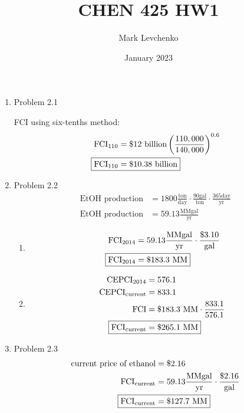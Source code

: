 \documentclass[12pt]{article}
\title{CHEN 425 HW1}
\author{Mark Levchenko}
\date{January 2023}
\begin{document}
\begin{enumerate}
    \item Problem 2.1 

    FCI using six-tenths method:
    \begin{align*}
        \mathrm{FCI}_{110} &= \$12 \text{ billion} \left( \frac{110,000}{140,000} \right)^{0.6} \\
        \Aboxed{\mathrm{FCI}_{110} &= \$10.38 \text{ billion}}
    \end{align*}

\newpage
    \item Problem 2.2
    \begin{align*}
        \text{EtOH production} &= 1800 \frac{\mathrm{ton}}{\mathrm{day}} \cdot \frac{90 \mathrm{gal}}{\mathrm{ton}} \cdot \frac{365 \mathrm{day}}{\mathrm{yr}} \\
        \text{EtOH production} &= 59.13 \frac{\mathrm{MMgal}}{\mathrm{yr}}
    \end{align*}
    \begin{enumerate}
        \item 
        \begin{align*}
            \mathrm{FCI}_{2014} &= 59.13 \frac{\mathrm{MMgal}}{\mathrm{yr}} \cdot \frac{\$ 3.10}{\mathrm{gal}} \\
            \Aboxed{\mathrm{FCI}_{2014} &= \$ 183.3 \text{ MM}}
        \end{align*}
        \item
        \begin{align*}
            \mathrm{CEPCI}_{2014} &= 576.1 \\
            \mathrm{CEPCI}_{\mathrm{current}} &= 833.1 \\
            \mathrm{FCI} &= \$ 183.3 \text{ MM} \cdot \frac{833.1}{576.1} \\
            \Aboxed{\mathrm{FCI}_{\mathrm{current}} &= \$ 265.1 \text{ MM}}
        \end{align*}
    \end{enumerate}

\newpage
    \item Problem 2.3
    \begin{align*}
        \text{current price of ethanol} &= \$ 2.16 \\
        \mathrm{FCI}_{\mathrm{current}} &= 59.13 \frac{\mathrm{MMgal}}{\mathrm{yr}} \cdot \frac{\$ 2.16}{\mathrm{gal}} \\
        \Aboxed{\mathrm{FCI}_{\mathrm{current}} &= \$ 127.7 \text{ MM}}
    \end{align*}


\end{enumerate}
\end{document}
